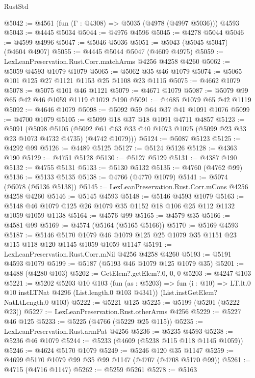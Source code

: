 \begin{lexlean}{RustStd}
\begin{coremodule}
{\begin{coremodule}
{{{{{{{{{{{{{{{{{{{{{{{{{{{{{{{{{{{@5042 := @4561 (fun (Γ : @4308) => @5035 (@4978 (@4997 @5036))) @4593
@5043 := @4445 @5034
@5044 := @4976 @4596
@5045 := @4278 @5044
@5046 := @4599 @4996
@5047 := @5046 @5036
@5051 := @5043 (@5045 @5047) (@4604 @4907)
@5055 := @4445 @5044 @5047 (@4609 @4975)
@5059 := LexLeanPreservation.Rust.Corr.matchArms @4256 @4258 @4260
@5062 := @5059 @4593 @1079 @1079
@5065 := @5062 @35 @46 @1079
@5074 := @5065 @101 @125 @27 @1121 @1153 @25 @1108 @23 @1115
@5075 := @4662 @1079
@5078 := @5075 @101 @46 @1121
@5079 := @4671 @1079
@5087 := @5079 @99 @65 @42 @46 @1059 @1119 @1079 @190
@5091 := @4685 @1079 @65 @42 @1119
@5092 := @4646 @1079
@5098 := @5092 @59 @64 @37 @41 @1091 @1076
@5099 := @4700 @1079
@5105 := @5099 @18 @37 @18 @1091 @4711 @4857
@5123 := @5091
    (@5098
      @5105
      (@5092 @61 @63 @33 @40 @1073 @1075 (@5099 @23 @33 @23 @1073 @4732 @4735) (@4742 @1079)))
@5124 := @5087 @5123
@5125 := @4292 @99
@5126 := @4489 @5125
@5127 := @5124 @5126
@5128 := @4363 @190
@5129 := @4751 @5128
@5130 := @5127 @5129
@5131 := @4387 @190
@5132 := @4755 @5131
@5133 := @5130 @5132
@5135 := @4760 (@4762 @99)
@5136 := @5133 @5135
@5138 := @4766 (@4770 @1079)
@5141 := @5074 (@5078 (@5136 @5138))
@5145 := LexLeanPreservation.Rust.Corr.mCons @4256 @4258 @4260
@5146 := @5145 @4593
@5148 := @5146 @4593 @1079
@5163 := @5148 @46 @1079 @125 @26 @1079 @35 @1152 @18 @106 @25 @112 @1132 @1059 @1059 @1138
@5164 := @4576 @99
@5165 := @4579 @35
@5166 := @4581 @99
@5169 := @4574 (@5164 (@5165 @5166))
@5170 := @5169 @4593
@5187 := @5146
    @5170
    @1079
    @46
    @1079
    @125
    @25
    @1079
    @35
    @1151
    @23
    @115
    @118
    @120
    @1145
    @1059
    @1059
    @1147
@5191 := LexLeanPreservation.Rust.Corr.mNil @4256 @4258 @4260
@5193 := @5191 @4593 @1079
@5199 := @5187 (@5193 @46 @1079 @125 @1079 @35)
@5201 := @4488 (@4280 @103)
@5202 := GetElem?.getElem?.{0, 0, 0}
@5203 := @4247 @103
@5221 := @5202
    @5203
    @10
    @103
    (fun (as : @5203) =>
    fun (i : @10) => LT.lt.{0} @10 instLTNat @4296 (List.length.{0} @103 @4341))
    (List.instGetElem?NatLtLength.{0} @103)
@5222 := @5221 @125
@5225 := @5199 (@5201 (@5222 @23))
@5227 := LexLeanPreservation.Rust.otherArms @4256
@5229 := @5227 @46 @125
@5233 := @5225 (@4766 (@5229 @25 @115))
@5235 := LexLeanPreservation.Rust.armPat @4256
@5236 := @5235 @4593
@5238 := @5236 @46 @1079
@5244 := @5233 (@4609 (@5238 @115 @118 @1145 @1059))
@5246 := @4624 @5170 @1079
@5249 := @5246 @120 @35 @1147
@5259 := @4699 @5170 @1079 @99 @35 @99 @1147 (@4707 (@4708 @5170 @99))
@5261 := @4715 (@4716 @1147)
@5262 := @5259 @5261
@5278 := @5163
}}}}}}}}}}}}}}}}}}}}}}}}}}}}}}}}}}}
\end{coremodule}}
\end{coremodule}
\end{lexlean}
